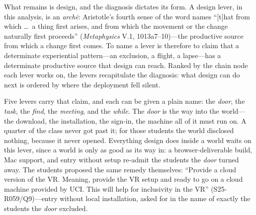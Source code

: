 What remains is design, and the diagnosis dictates its form. A design
lever, in this analysis, is an \textit{archē}: Aristotle's fourth
sense of the word names ``[t]hat from which \ldots\ a thing first
arises, and from which the movement or the change naturally first
proceeds'' (\textit{Metaphysics} V.1, 1013a7--10)---the productive
source from which a change first comes. To name a lever is therefore
to claim that a determinate experiential pattern---an exclusion, a
flight, a lapse---has a determinate productive source that design can
reach. Ranked by the chain node each lever works on, the levers
recapitulate the diagnosis: what design can do next is ordered by
where the deployment fell silent.

Five levers carry that claim, and each can be given a plain name: the
\textit{door}, the \textit{task}, the \textit{find}, the
\textit{meeting}, and the \textit{while}. The \textit{door} is the way
into the world---the download, the installation, the sign-in, the
machine all of it must run on. A quarter of the class never got past
it; for those students the world disclosed nothing, because it never
opened. Everything design does inside a world waits on this lever,
since a world is only as good as its way in: a browser-deliverable
build, Mac support, and entry without setup re-admit the students the
\textit{door} turned away. The students proposed the same remedy
themselves: ``Provide a cloud version of the VR. Meaning, provide the VR
setup and ready to go on a cloud machine provided by UCI. This will help
for inclusivity in the VR'' (S25-R059/Q9)---entry without local
installation, asked for in the name of exactly the students the
\textit{door} excluded.

